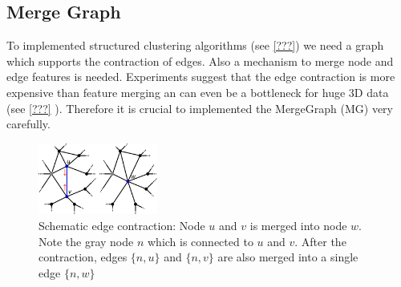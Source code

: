\subsection{Merge Graph} \label{sec:graphs_merge_graph}
To implemented structured clustering algorithms (see \cref{???}) we
need a graph which supports the contraction of edges.
Also a mechanism to merge node and edge features is needed.
Experiments suggest that the edge contraction is more expensive
than feature merging an can even be a bottleneck for huge 3D data 
(see \cref{???} ).
Therefore it is crucial to implemented the MergeGraph (MG) very carefully.
\begin{figure}
    \centering
    \includegraphics[width=0.35\textwidth]{fig/contraction.pdf}


    \caption[Schematic edge contraction]{ Schematic edge contraction: Node $u$ and $v$ is merged into node $w$.
        Note the gray node $n$ which is connected to $u$ and $v$.
        After the contraction, edges $\{ n,u\}$ and $\{ n,v\}$ are also merged into 
        a single edge $\{ n, w\}$ 
    }
    \label{fig:figlabel}
\end{figure}


   


